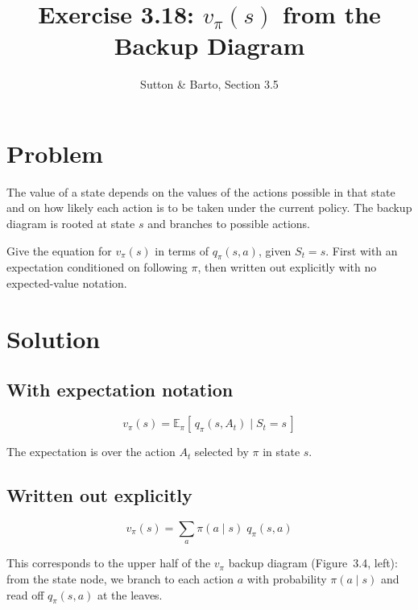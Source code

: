 \documentclass[11pt]{article}
\title{Exercise 3.18: $v_\pi(s)$ from the Backup Diagram}
\author{Sutton \& Barto, Section 3.5}
\date{}
\begin{document}
\maketitle

\section*{Problem}

The value of a state depends on the values of the actions possible in that
state and on how likely each action is to be taken under the current policy.
The backup diagram is rooted at state $s$ and branches to possible actions.

Give the equation for $v_\pi(s)$ in terms of $q_\pi(s, a)$, given $S_t = s$.
First with an expectation conditioned on following $\pi$, then written out
explicitly with no expected-value notation.

\section*{Solution}

\subsection*{With expectation notation}

\[
    v_\pi(s) = \mathbb{E}_\pi\!\left[\, q_\pi(s, A_t) \mid S_t = s \,\right]
\]

The expectation is over the action $A_t$ selected by $\pi$ in state $s$.

\subsection*{Written out explicitly}

\[
    \boxed{v_\pi(s) = \sum_{a} \pi(a \mid s)\; q_\pi(s, a)}
\]

This corresponds to the upper half of the $v_\pi$ backup diagram (Figure~3.4,
left): from the state node, we branch to each action $a$ with probability
$\pi(a \mid s)$ and read off $q_\pi(s, a)$ at the leaves.
\end{document}
